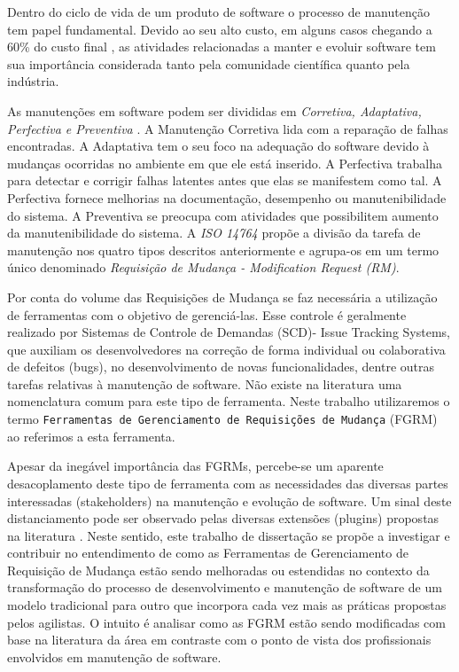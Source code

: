 Dentro do ciclo de vida de um produto de software o processo de manutenção tem
papel fundamental. Devido ao seu alto custo, em alguns casos chegando a 60\%
do custo final \cite{kaur2015review}, as atividades relacionadas a manter e
evoluir software tem sua importância considerada tanto pela comunidade
científica quanto pela indústria.

As manutenções em software podem ser divididas em \textit{Corretiva, Adaptativa,
Perfectiva e Preventiva} \cite{Lientz:1980:SMM:601062,159342}. A Manutenção
Corretiva lida com a reparação de falhas encontradas. A Adaptativa tem o seu
foco na adequação do software devido à mudanças ocorridas no ambiente em que ele
está inserido. A Perfectiva trabalha para detectar e corrigir falhas latentes
antes que elas se manifestem como tal. A  Perfectiva fornece melhorias na
documentação, desempenho ou manutenibilidade do sistema. A Preventiva se
preocupa com atividades que possibilitem aumento da manutenibilidade do sistema.
A \textit{ISO 14764} \cite{1703974} propõe a divisão da tarefa de manutenção nos
quatro tipos descritos anteriormente e agrupa-os em um termo único denominado
\textit{Requisição de Mudança - Modification Request (RM)}.

Por conta do volume das Requisições de Mudança se faz necessária a utilização de
ferramentas com o objetivo de gerenciá-las. Esse controle é geralmente realizado
por Sistemas de Controle de Demandas (SCD)- Issue Tracking Systems, que auxiliam
os desenvolvedores na correção de forma individual ou colaborativa de defeitos
(bugs), no desenvolvimento de novas funcionalidades, dentre outras tarefas
relativas à manutenção de software. Não existe na literatura uma nomenclatura
comum para este tipo de ferramenta. Neste trabalho utilizaremos o termo
\texttt{Ferramentas de Gerenciamento de Requisições de Mudança} (FGRM) ao
referimos a esta ferramenta.

Apesar da inegável importância das FGRMs, percebe-se um aparente desacoplamento 
deste tipo de ferramenta com as necessidades das diversas partes interessadas
(stakeholders) na manutenção e evolução de software. Um sinal deste
distanciamento pode ser observado pelas diversas extensões (plugins) propostas
na literatura
\cite{101186,Thung:2014:BIT:2635868.2661678,Kononenko:2014:DED:2591062.2591075}.
Neste sentido, este trabalho de dissertação se propõe a investigar e contribuir
no entendimento de como as Ferramentas de Gerenciamento de Requisição de Mudança
estão sendo melhoradas ou estendidas no contexto da transformação do processo de
desenvolvimento e manutenção de software de um modelo tradicional para outro que
incorpora cada vez mais as práticas propostas pelos agilistas. O intuito é
analisar como as FGRM estão sendo modificadas com base na literatura da área em
contraste com o ponto de vista dos profissionais envolvidos em manutenção de
software.

